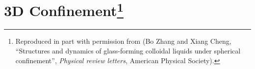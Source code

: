 \chapter[3D Confinement]{3D Confinement\footnote[1]{
Reproduced in part with permission from (Bo Zhang and Xiang Cheng, ``Structures and dynamics of glass-forming colloidal liquids under spherical confinement'', \textit{Physical review letters}, American Physical Society).
}}

\label{3D_confinement}
